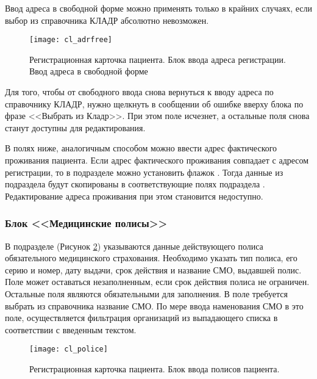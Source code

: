 \begin{vnim}
Ввод адреса в свободной форме можно применять только в крайних случаях, если выбор из справочника КЛАДР абсолютно невозможен. 
\end{vnim}

\begin{figure}[ht]\centering
 \texttt{[image: cl\_adrfree]}
 \caption{Регистрационная карточка пациента. Блок ввода адреса регистрации. Ввод адреса в свободной форме}
 \label{img_cl_adrfree}
\end{figure}   

\begin{prim}
Для того, чтобы от свободного ввода снова вернуться к вводу адреса по справочнику КЛАДР, нужно щелкнуть в сообщении об ошибке вверху блока по фразе <<Выбрать из Кладр>>. При этом поле  исчезнет, а остальные поля снова станут доступны для редактирования.
\end{prim}

В полях ниже, аналогичным способом можно ввести адрес фактического проживания пациента. Если адрес фактического проживания совпадает с адресом регистрации, то в подразделе  можно установить флажок . Тогда данные из подраздела  будут скопированы в соответствующие полях подраздела . Редактирование адреса проживания при этом становится недоступно. 
 
\subsubsection{Блок <<Медицинские полисы>>}
  
В подразделе  (Рисунок \ref{img_cl_police}) указываются данные действующего полиса обязательного медицинского страхования. Необходимо указать тип полиса, его серию и номер, дату выдачи, срок действия и название СМО, выдавшей полис. Поле  может оставаться незаполненным, если срок действия полиса не ограничен. Остальные поля являются обязательными для заполнения. В поле  требуется выбрать из справочника название СМО. По мере ввода наменования СМО в это поле, осуществляется фильтрация организаций из выпадающего списка в соответствии с введенным текстом.

\begin{figure}[ht]\centering
 \texttt{[image: cl\_police]}
 \caption{Регистрационная карточка пациента. Блок ввода полисов пациента.}
 \label{img_cl_police}
\end{figure}  

